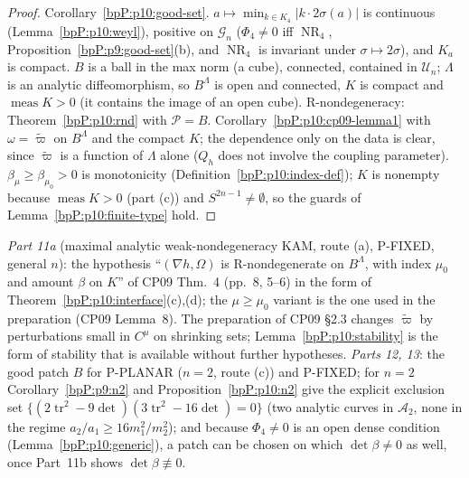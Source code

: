 \begin{proof}
\label{stepP:p10:if-a} Corollary~\ref{bpP:p10:good-set}.
\label{stepP:p10:if-b} $a\mapsto\min_{k\in K_4}\lvert k\cdot2\sigma(a)\rvert$ is continuous (Lemma~\ref{bpP:p10:weyl}), positive on $\mathcal G_n$ ($\Phi_4\ne0$ iff $\operatorname{NR}_4$, Proposition~\ref{bpP:p9:good-set}(b), and $\operatorname{NR}_4$ is invariant under $\sigma\mapsto2\sigma$), and $K_a$ is compact.
\label{stepP:p10:if-c} $B$ is a ball in the max norm (a cube), connected, contained in $\mathcal U_n$; $\Lambda$ is an analytic diffeomorphism, so $B^\Lambda$ is open and connected, $K$ is compact and $\operatorname{meas}K>0$ (it contains the image of an open cube). R-nondegeneracy: Theorem~\ref{bpP:p10:rnd} with $\mathcal P=B$.
\label{stepP:p10:if-d} Corollary~\ref{bpP:p10:cp09-lemma1} with $\omega=\tilde\varpi$ on $B^\Lambda$ and the compact $K$; the dependence only on the data is clear, since $\tilde\varpi$ is a function of $\Lambda$ alone ($Q_h$ does not involve the coupling parameter). $\beta_\mu\ge\beta_{\mu_0}>0$ is monotonicity (Definition~\ref{bpP:p10:index-def}); $K$ is nonempty because $\operatorname{meas}K>0$ (part (c)) and $S^{2n-1}\ne\emptyset$, so the guards of Lemma~\ref{bpP:p10:finite-type} hold.
\end{proof}

\begin{remark}\label{bpP:p10:consumers}
\emph{Part 11a} (maximal analytic weak-nondegeneracy KAM, route (a), P-FIXED, general $n$): the hypothesis ``$(\nabla h,\Omega)$ is R-nondegenerate on $B^\Lambda$, with index $\mu_0$ and amount $\beta$ on $K$'' of CP09 Thm.~4 (pp.~8, 5--6) in the form of Theorem~\ref{bpP:p10:interface}(c),(d); the $\mu\ge\mu_0$ variant is the one used in the preparation (CP09 Lemma~8). The preparation of CP09 \S2.3 changes $\tilde\varpi$ by perturbations small in $C^\mu$ on shrinking sets; Lemma~\ref{bpP:p10:stability} is the form of stability that is available without further hypotheses. \emph{Parts 12, 13}: the good patch $B$ for P-PLANAR ($n=2$, route (c)) and P-FIXED; for $n=2$ Corollary~\ref{bpP:p9:n2} and Proposition~\ref{bpP:p10:n2} give the explicit exclusion set $\{(2\operatorname{tr}^2-9\det)(3\operatorname{tr}^2-16\det)=0\}$ (two analytic curves in $\mathcal A_2$, none in the regime $a_2/a_1\ge16m_1^2/m_2^2$); and because $\Phi_4\ne0$ is an open dense condition (Lemma~\ref{bpP:p10:generic}), a patch can be chosen on which $\operatorname{det}\beta\ne0$ as well, once Part~11b shows $\det\beta\not\equiv0$.
\end{remark}

